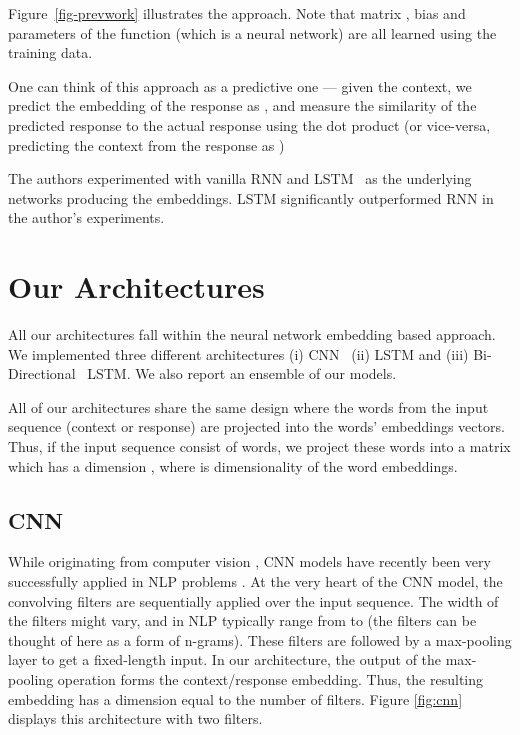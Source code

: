 \documentclass{article} \usepackage{nips15submit_e,times}
\newcommand{\MARTINSECOND}[1]{{\color{black}#1}} \newcommand{\MARTINTHIRD}[1]{{\color{black}#1}} \newcommand{\COPY}[1]{{\color{black}[#1]}}
\begin{document}
{Figure~\ref{fig-prevwork} illustrates the approach. Note that matrix , bias  and parameters of the function  (which is a neural network) are all learned using the training data.

One can think of this approach as a predictive one --- given the context,
we predict the embedding of the response as
, and measure the similarity of the predicted response  to the actual response  using the dot product
(or vice-versa, predicting the context from the response as )

The authors experimented with vanilla RNN and LSTM~\cite{Hochreiter1997} as the underlying networks producing the embeddings.
LSTM significantly outperformed RNN in the author's experiments.
}


\section{Our Architectures}

\MARTINSECOND
{


All our architectures fall within the neural network embedding based approach.
We implemented three different architectures
(i) CNN~\cite{kim2014convolutional} (ii) LSTM and (iii) Bi-Directional~\cite{Schuster1997} LSTM.
We also report an ensemble of our models.

All of our architectures share the same design where the words from the input sequence (context or response) are projected
into the words' embeddings vectors.
Thus, if the input sequence consist of  words, we project these words into a matrix  which has
a dimension , where  is dimensionality of the word embeddings.
}
\subsection{CNN}


\MARTINSECOND
{ 
While originating from computer vision \cite{lecun1998gradient}, CNN models have
recently been very successfully applied in NLP problems \cite{kim2014convolutional}.
At the very heart of the CNN model, the convolving filters are sequentially applied over the input sequence.
The width of the filters might vary, and in NLP typically range from  to 
(the filters can be thought of here as a form of n-grams).
These filters are followed by a max-pooling layer to get a fixed-length input.
In our architecture, the output of the max-pooling operation forms the context/response embedding.
Thus, the resulting embedding has a dimension equal to the number of filters.
Figure \ref{fig:cnn} displays this architecture with two filters.
}
\end{document}
